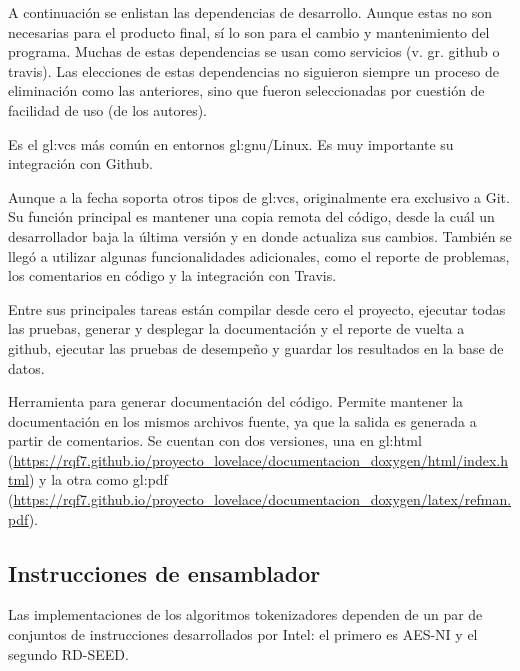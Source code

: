 A continuación se enlistan las dependencias de desarrollo.
Aunque estas no son necesarias para el producto final, sí lo son para
el cambio y mantenimiento del programa. Muchas de estas dependencias
se usan como servicios (v. gr. github o travis). Las elecciones
de estas dependencias no siguieron siempre un proceso de eliminación como las
anteriores, sino que fueron seleccionadas por cuestión de facilidad
de uso (de los autores).

{%
  Es el \gls{gl:vcs} más común en entornos \acrshort{gl:gnu}/Linux.
  Es muy importante su integración con Github.
}

{%
  Aunque a la fecha soporta otros tipos de \gls{gl:vcs}, originalmente
  era exclusivo a Git. Su función principal es mantener una copia
  remota del código, desde la cuál un desarrollador baja la última versión
  y en donde actualiza sus cambios. También se llegó a utilizar algunas
  funcionalidades adicionales, como el reporte de problemas, los comentarios
  en código y la integración con Travis.
}

{%
  Entre sus principales tareas están compilar desde cero el proyecto, ejecutar
  todas las pruebas, generar y desplegar la documentación y el reporte de
  vuelta a github, ejecutar las pruebas de desempeño y guardar los resultados
  en la base de datos.
}

{%
  Herramienta para generar documentación del código. Permite mantener la
  documentación en los mismos archivos fuente, ya que la salida es generada
  a partir de comentarios. Se cuentan con dos versiones, una en
  \acrshort{gl:html} (\url{https://rqf7.github.io/proyecto_lovelace/documentacion_doxygen/html/index.html})
  y la otra como \acrshort{gl:pdf} (\url{https://rqf7.github.io/proyecto_lovelace/documentacion_doxygen/latex/refman.pdf}).
}

\subsection{Instrucciones de ensamblador}
\label{sec:intel}

Las implementaciones de los algoritmos tokenizadores dependen de un par de
conjuntos de instrucciones desarrollados por Intel: el primero es AES-NI y el
segundo RD-SEED.

